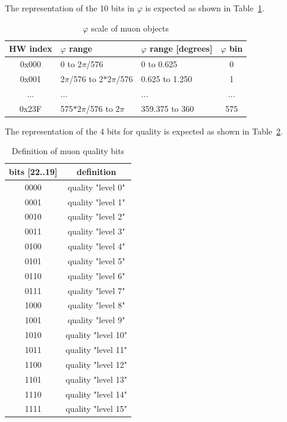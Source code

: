 The representation of the 10 bits in $\varphi$ is expected as shown in Table~\ref{tab:gtl:muon_phi_scale}.\\
 
\begin{table}[htdp]
\begin{center}
\begin{tabular}{|c|l|l|c|}\hline
HW index & $\varphi$ range & $\varphi$ range [degrees] & $\varphi$ bin\\\hline\hline
0x000 & 0 to 2$\pi$/576 & 0 to 0.625 & 0\\\hline
0x001 & 2$\pi$/576 to 2$*$2$\pi$/576 & 0.625 to 1.250 & 1\\\hline
... & ... & ... & ...\\\hline
0x23F & 575$*$2$\pi$/576 to 2$\pi$ & 359.375 to 360 & 575\\\hline
\end{tabular}
\end{center}
\caption{$\varphi$ scale of muon objects}
\label{tab:gtl:muon_phi_scale}
\end{table}

The representation of the 4 bits for quality is expected as shown in Table~\ref{tab:gtl:muon_quality_bits}.\\
 
\begin{table}[ht]
\caption{Definition of muon quality bits}
\vspace{5mm}
\centering
\begin{tabular}{|c|c|}\hline
bits [22..19] & definition \\\hline\hline
0000 & quality "level 0" \\
0001 & quality "level 1" \\
0010 & quality "level 2" \\
0011 & quality "level 3" \\
0100 & quality "level 4" \\
0101 & quality "level 5" \\
0110 & quality "level 6" \\
0111 & quality "level 7" \\
1000 & quality "level 8" \\
1001 & quality "level 9" \\
1010 & quality "level 10" \\
1011 & quality "level 11" \\
1100 & quality "level 12" \\
1101 & quality "level 13" \\
1110 & quality "level 14" \\
1111 & quality "level 15" \\\hline
\end{tabular}
\label{tab:gtl:muon_quality_bits}
\end{table}

